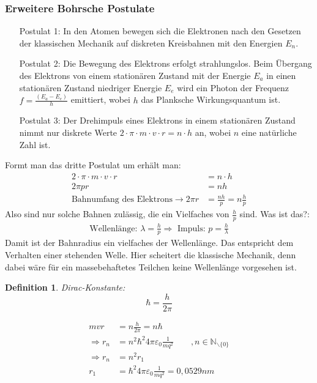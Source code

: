 \documentclass[12pt,a4paper]{report}%
\newtheorem{definition}[satz]{Definition}
\numberwithin{equation}{section}
\newcommand{\N}{\mathbb{N}}
\numberwithin{equation}{subsection}
\begin{document}
			\subsubsection{Erweitere Bohrsche Postulate}
			\begin{itemize}
			  \item[Postulat 1: ] In den Atomen bewegen sich die Elektronen nach den Gesetzen der klassischen Mechanik auf diskreten Kreisbahnen mit den Energien $E_n$.
			  \item[Postulat 2: ] Die Bewegung des Elektrons erfolgt strahlungslos. Beim Übergang des Elektrons von einem stationären Zustand mit der Energie $E_a$ in einen stationären Zustand niedriger Energie $E_e$ wird ein Photon der Frequenz $f = \frac{(E_a - E_e)}{h}$ emittiert, wobei $h$ das Planksche Wirkungsquantum ist.
			  \item[Postulat 3: ] Der Drehimpuls eines Elektrons in einem stationären Zustand nimmt nur diskrete Werte $2\cdot \pi \cdot m \cdot v \cdot r = n \cdot h$ an, wobei $n$ eine natürliche Zahl ist.
			\end{itemize}
		Formt man das dritte Postulat um erhält man:
		\begin{align}
		  2\cdot \pi \cdot m \cdot v \cdot r &= n \cdot h \nonumber \\
		  2 \pi p r &= n h \nonumber \\
		  \text{Bahnumfang des Elektrons} \rightarrow 2  \pi r &= \frac{nh}{p}= n \frac{h}{p}
		\end{align}
		Also sind nur solche Bahnen zulässig, die ein Vielfaches von $\frac{h}{p}$ sind. Was ist das?:
		\begin{align}
		  \text{Wellenlänge: } \lambda = \frac{h}{p} \Rightarrow \text{ Impuls: } p = \frac{h}{\lambda}
		\end{align}
		Damit ist der Bahnradius ein vielfaches der Wellenlänge. Das entspricht dem Verhalten einer stehenden Welle. Hier scheitert die klassische Mechanik, denn dabei wäre für ein massebehaftetes Teilchen keine Wellenlänge vorgesehen ist.
		\begin{definition}
		  Dirac-Konstante:
		  \begin{equation}
		    \hbar = \frac{h}{2 \pi}
		  \end{equation}
		\end{definition}
		\begin{align*}
		  mvr &= n \frac{h}{2\pi} = n \hbar \\
		  \Rightarrow r_{n} &= n^2 \hbar ^2 4 \pi \varepsilon_0 \frac{1}{mq^2}\qquad ,n \in \N_{\backslash \lbrace 0 \rbrace}\\
		  \Rightarrow r_n &= n^2 r_1 \\
		  r_1 &=  \hbar ^2 4 \pi \varepsilon_0 \frac{1}{mq^2} = 0,0529nm
		\end{align*}
\end{document}
